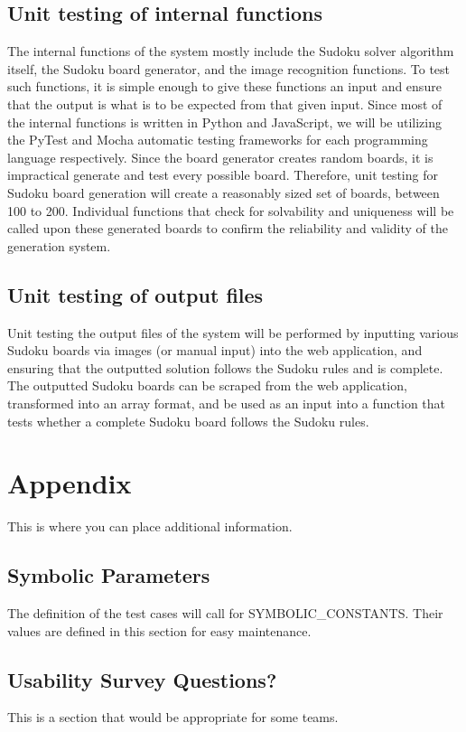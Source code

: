 \documentclass[11pt]{article}
\begin{document}
\subsection{Unit testing of internal functions}
The internal functions of the system mostly include the Sudoku solver algorithm itself, the Sudoku board generator, and the image recognition functions. To test such functions, it is simple enough to give these functions an input and ensure that the output is what is to be expected from that given input. Since most of the internal functions is written in Python and JavaScript, we will be utilizing the PyTest and Mocha automatic testing frameworks for each programming language respectively. Since the board generator creates random boards, it is impractical generate and test every possible board. Therefore, unit testing for Sudoku board generation will create a reasonably sized set of boards, between 100 to 200. Individual functions that check for solvability and uniqueness will be called upon these generated boards to confirm the reliability and validity of the generation system. 
		
\subsection{Unit testing of output files}		
Unit testing the output files of the system will be performed by inputting various Sudoku boards via images (or manual input) into the web application, and ensuring that the outputted solution follows the Sudoku rules and is complete. The outputted Sudoku boards can be scraped from the web application, transformed into an array format, and be used as an input into a function that tests whether a complete Sudoku board follows the Sudoku rules. 





\newpage

\section{Appendix}

This is where you can place additional information.

\subsection{Symbolic Parameters}

The definition of the test cases will call for SYMBOLIC\_CONSTANTS.
Their values are defined in this section for easy maintenance.

\subsection{Usability Survey Questions?}

This is a section that would be appropriate for some teams.
\end{document}
